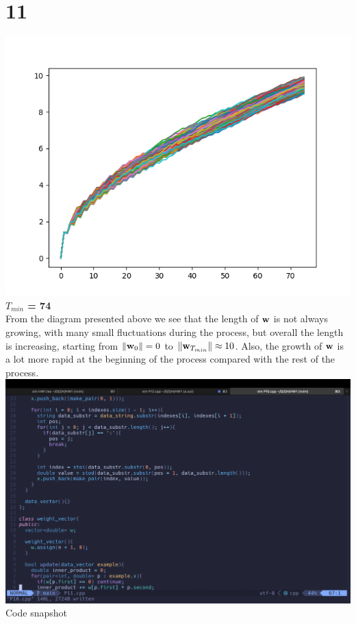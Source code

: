 \documentclass[11pt]{article}
\theoremstyle{definition}
\begin{document}
\section*{11}
\includegraphics{P11_figure.png} \\
\textbf{$T_{min}$ = 74} \\
From the diagram presented above we see that the length of $\vb{w}$ is not always growing, with many small fluctuations during the process, but overall the  length is increasing, starting from $\norm{\vb{w}_0} = 0$ to $\norm{\vb{w}_{T_{min}}} \approx 10$. Also, the growth of $\vb{w}$ is a lot more rapid at the beginning of the process compared with the rest of the process. 
\newline
\includegraphics[width = \textwidth]{P11_code.png}\\
Code snapshot\\ 
\newpage
\end{document}
